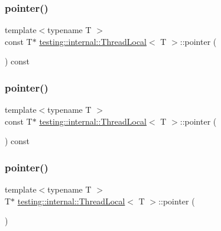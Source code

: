 \subsubsection{\texorpdfstring{pointer()}{pointer()}\hspace{0.1cm}{\footnotesize\ttfamily [3/6]}}
{\footnotesize\ttfamily template$<$typename T $>$ \\
const T$\ast$ \mbox{\hyperlink{classtesting_1_1internal_1_1_thread_local}{testing\+::internal\+::\+Thread\+Local}}$<$ T $>$\+::pointer (\begin{DoxyParamCaption}{ }\end{DoxyParamCaption}) const\hspace{0.3cm}{\ttfamily [inline]}}

\mbox{\label{classtesting_1_1internal_1_1_thread_local_a57e45bb60e3cd94abb04fa449e9f0367}} 
\subsubsection{\texorpdfstring{pointer()}{pointer()}\hspace{0.1cm}{\footnotesize\ttfamily [4/6]}}
{\footnotesize\ttfamily template$<$typename T $>$ \\
const T$\ast$ \mbox{\hyperlink{classtesting_1_1internal_1_1_thread_local}{testing\+::internal\+::\+Thread\+Local}}$<$ T $>$\+::pointer (\begin{DoxyParamCaption}{ }\end{DoxyParamCaption}) const\hspace{0.3cm}{\ttfamily [inline]}}

\mbox{\label{classtesting_1_1internal_1_1_thread_local_a882f57fed4b074de83693c0c0fe62858}} 
\subsubsection{\texorpdfstring{pointer()}{pointer()}\hspace{0.1cm}{\footnotesize\ttfamily [5/6]}}
{\footnotesize\ttfamily template$<$typename T $>$ \\
T$\ast$ \mbox{\hyperlink{classtesting_1_1internal_1_1_thread_local}{testing\+::internal\+::\+Thread\+Local}}$<$ T $>$\+::pointer (\begin{DoxyParamCaption}{ }\end{DoxyParamCaption})\hspace{0.3cm}{\ttfamily [inline]}}

